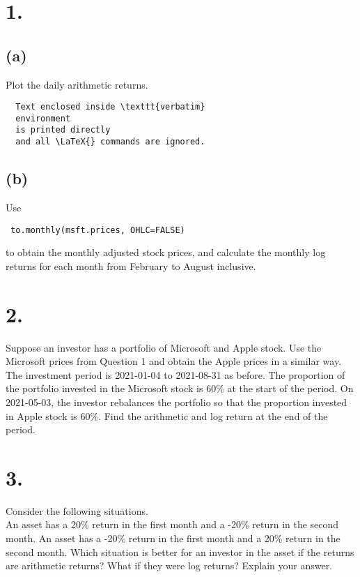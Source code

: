 \documentclass{article}
\begin{document}
\thispagestyle{firstpageheader}

\section*{1.}
{\Large 

\subsection*{(a)}

Plot the daily arithmetic returns.

\begin{verbatim}
  Text enclosed inside \texttt{verbatim}
  environment 
  is printed directly 
  and all \LaTeX{} commands are ignored.
\end{verbatim}

\subsection*{(b)}
Use
\begin{verbatim} to.monthly(msft.prices, OHLC=FALSE) \end{verbatim}
to obtain the monthly adjusted stock prices, and calculate the monthly log returns for each month from February to August inclusive.



}

\section*{2.}
{\Large

Suppose an investor has a portfolio of Microsoft and Apple stock. Use the Microsoft prices from Question 1 and obtain the Apple prices in a similar way. The investment period is 2021-01-04 to 2021-08-31 as before. The proportion of the portfolio invested in the Microsoft stock is 60\% at the start of the period. On 2021-05-03, the investor rebalances the portfolio so that the proportion invested in Apple stock is 60\%. Find the arithmetic and log return at the end of the period.

}

\section*{3.}
{\Large 

Consider the following situations. \\
An asset has a 20\% return in the first month and a -20\% return in the second month.
An asset has a -20\% return in the first month and a 20\% return in the second month.
Which situation is better for an investor in the asset if the returns are arithmetic returns? What if they were log returns? Explain your answer.

}
\end{document}
